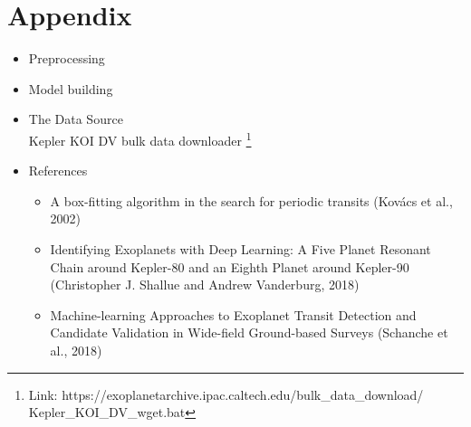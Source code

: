 \documentclass[%
aip,
amsmath,amssymb,
reprint,%
]{revtex4-1}
\begin{document}
\vspace{60 mm}
\section*{Appendix}

\begin{itemize}
\item Preprocessing
\end{itemize}



\begin{itemize}
\item Model building
\end{itemize}




\begin{itemize}
\item The Data Source\\
Kepler KOI DV bulk data downloader \footnote{Link: https://exoplanetarchive.ipac.caltech.edu/bulk\_data\_download/\\Kepler\_KOI\_DV\_wget.bat}

\item References \\
\begin{itemize}
\item A box-fitting algorithm in the search for periodic transits (Kovács et al., 2002)
\item Identifying Exoplanets with Deep Learning: A Five Planet Resonant Chain around Kepler-80 and an Eighth Planet around Kepler-90 (Christopher J. Shallue and Andrew Vanderburg, 2018)
\item Machine-learning Approaches to Exoplanet Transit Detection and Candidate Validation in Wide-field Ground-based Surveys (Schanche et al., 2018)
\end{itemize}

\end{itemize}
\end{document}
